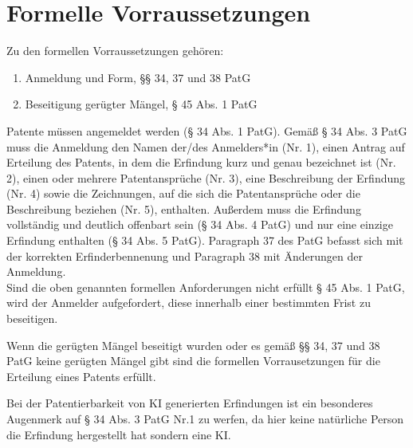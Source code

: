\section{Formelle Vorraussetzungen}

Zu den formellen Vorraussetzungen gehören:
\begin{enumerate}
    \item Anmeldung und Form, §§ 34, 37 und 38 PatG 
    \vspace{-0.11in} 
    \item Beseitigung gerügter Mängel, § 45 Abs. 1 PatG
\end{enumerate}

Patente müssen angemeldet werden (§ 34 Abs. 1 PatG). 
Gemäß § 34 Abs. 3 PatG muss die Anmeldung den Namen der/des Anmelders*in 
(Nr. 1), einen Antrag auf Erteilung des Patents, 
in dem die Erfindung kurz und genau bezeichnet ist (Nr. 2), 
einen oder mehrere Patentansprüche (Nr. 3), 
eine Beschreibung der Erfindung (Nr. 4) sowie die Zeichnungen, 
auf die sich die Patentansprüche oder die Beschreibung beziehen (Nr. 5), 
enthalten. 
Außerdem muss die Erfindung vollständig und deutlich offenbart sein (§ 34 Abs. 4 PatG) 
und nur eine einzige Erfindung enthalten (§ 34 Abs. 5 PatG). 
Paragraph 37 des PatG befasst sich mit der korrekten Erfinderbennenung 
und Paragraph 38 mit Änderungen der Anmeldung. 
\\

Sind die oben genannten formellen Anforderungen nicht erfüllt § 45 Abs. 1 PatG, 
wird der Anmelder aufgefordert, diese innerhalb einer bestimmten Frist zu beseitigen.

Wenn die gerügten Mängel beseitigt wurden 
oder es gemäß §§ 34, 37 und 38 PatG keine gerügten Mängel gibt 
sind die formellen Vorrausetzungen für die Erteilung eines Patents erfüllt.

Bei der Patentierbarkeit von KI generierten Erfindungen ist ein besonderes Augenmerk
auf § 34 Abs. 3 PatG Nr.1 zu werfen, da hier keine natürliche Person
die Erfindung hergestellt hat sondern eine KI.


